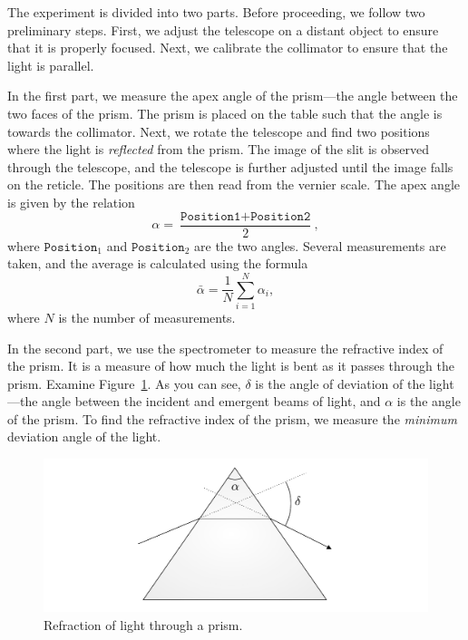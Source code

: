 \documentclass[10pt]{article}
\begin{document}
The experiment is divided into two parts. Before proceeding, we follow two preliminary steps. First, we adjust the telescope on a distant object to ensure that it is properly focused. Next, we calibrate the collimator to ensure that the light is parallel.

In the first part, we measure the apex angle of the prism---the angle between the two faces of the prism. The prism is placed on the table such that the angle is towards the collimator. Next, we rotate the telescope and find two positions where the light is \textit{reflected} from the prism. The image of the slit is observed through the telescope, and the telescope is further adjusted until the image falls on the reticle. The positions are then read from the vernier scale. The apex angle is given by the relation
\begin{equation}
    \alpha = \frac{\texttt{Position1} + \texttt{Position2}}{2},
\end{equation}
where $\texttt{Position}_1$ and $\texttt{Position}_2$ are the two angles. Several measurements are taken, and the average is calculated using the formula
\begin{equation}
    \bar{\alpha} = \frac{1}{N} \sum_{i=1}^{N} \alpha_i,
\end{equation}
where $N$ is the number of measurements.

In the second part, we use the spectrometer to measure the refractive index of the prism. It is a measure of how much the light is bent as it passes through the prism. Examine Figure~\ref{fig:1}. As you can see, $\delta$ is the angle of deviation of the light---the angle between the incident and emergent beams of light, and $\alpha$ is the angle of the prism. To find the refractive index of the prism, we measure the \textit{minimum} deviation angle of the light. 

\begin{figure}[ht]
    \centering
    \includegraphics[scale=0.6]{figures/f1.pdf}
    \caption{Refraction of light through a prism.}
    \label{fig:1}
\end{figure}
\end{document}
